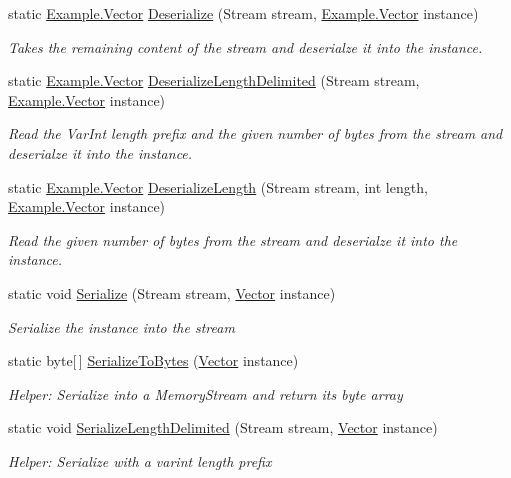\begin{DoxyCompactItemize}
static \hyperlink{class_example_1_1_vector}{Example.\+Vector} \hyperlink{class_example_1_1_vector_a1eaf2f0f8c1289888fa799ad8c16fa21}{Deserialize} (Stream stream, \hyperlink{class_example_1_1_vector}{Example.\+Vector} instance)
\begin{DoxyCompactList}\small\item\em Takes the remaining content of the stream and deserialze it into the instance.\end{DoxyCompactList}\item 
static \hyperlink{class_example_1_1_vector}{Example.\+Vector} \hyperlink{class_example_1_1_vector_a3092148f5634ca0cc425bcb6f83c5533}{Deserialize\+Length\+Delimited} (Stream stream, \hyperlink{class_example_1_1_vector}{Example.\+Vector} instance)
\begin{DoxyCompactList}\small\item\em Read the Var\+Int length prefix and the given number of bytes from the stream and deserialze it into the instance.\end{DoxyCompactList}\item 
static \hyperlink{class_example_1_1_vector}{Example.\+Vector} \hyperlink{class_example_1_1_vector_aa5e9f156e0489ef1c5bc9578dfd545a1}{Deserialize\+Length} (Stream stream, int length, \hyperlink{class_example_1_1_vector}{Example.\+Vector} instance)
\begin{DoxyCompactList}\small\item\em Read the given number of bytes from the stream and deserialze it into the instance.\end{DoxyCompactList}\item 
static void \hyperlink{class_example_1_1_vector_af60b9bcba3c2dddfc4ef780c5d2786c6}{Serialize} (Stream stream, \hyperlink{class_example_1_1_vector}{Vector} instance)
\begin{DoxyCompactList}\small\item\em Serialize the instance into the stream\end{DoxyCompactList}\item 
static byte\mbox{[}$\,$\mbox{]} \hyperlink{class_example_1_1_vector_aae89c55b304738980925ebbcfdbfa946}{Serialize\+To\+Bytes} (\hyperlink{class_example_1_1_vector}{Vector} instance)
\begin{DoxyCompactList}\small\item\em Helper\+: Serialize into a Memory\+Stream and return its byte array\end{DoxyCompactList}\item 
static void \hyperlink{class_example_1_1_vector_ad5dad3812b90c5fe6669407f8588fbf5}{Serialize\+Length\+Delimited} (Stream stream, \hyperlink{class_example_1_1_vector}{Vector} instance)
\begin{DoxyCompactList}\small\item\em Helper\+: Serialize with a varint length prefix\end{DoxyCompactList}\end{DoxyCompactItemize}
